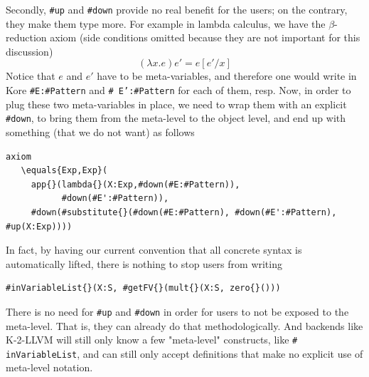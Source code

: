 \documentclass[UTF8,11pt]{article}
\theoremstyle{plain}
\theoremstyle{definition}
\theoremstyle{remark}
\newcommand{\sharpsymbol}{\#}
\newcommand{\sharpup}{\texttt{\sharpsymbol up}}
\newcommand{\sharpdown}{\texttt{\sharpsymbol down}}
\newcommand{\KPattern}{\texttt{\sharpsymbol Pattern}}
\begin{document}
Secondly, {\sharpup} and {\sharpdown} provide no real benefit for the users; on
the contrary, they make them type more.
For example in lambda calculus, we have the $\beta$-reduction axiom (side
conditions omitted because they are not important for this discussion)
$$(\lambda x . e)e' = e[e'/x]$$
Notice that $e$ and $e'$ have to be meta-variables, and therefore one would
write in Kore {\texttt{\sharpsymbol E:\KPattern}} and {\texttt{\sharpsymbol
E':\KPattern}} for each of them, resp.
Now, in order to plug these two meta-variables in place, we need to wrap them
with an explicit {\sharpdown}, to bring them from the meta-level to the object
level, and end up with something (that we do not want) as follows
\begin{lstlisting}[language=kore]
axiom
   \equals{Exp,Exp}(
     app{}(lambda{}(X:Exp,#down(#E:#Pattern)),
           #down(#E':#Pattern)),
     #down(#substitute{}(#down(#E:#Pattern), #down(#E':#Pattern), #up(X:Exp))))
\end{lstlisting}
In fact, by having our current convention that all concrete syntax is
automatically lifted, there is nothing to stop users from writing
\begin{lstlisting}[language=kore]
    #inVariableList{}(X:S, #getFV{}(mult{}(X:S, zero{}()))
\end{lstlisting}
There is no need for
{\sharpup} and {\sharpdown} in order for users to not be exposed
to the meta-level.  That
is, they can already do that methodologically. And backends like K-2-LLVM will
still only know a few "meta-level" constructs, like \texttt{\sharpsymbol
inVariableList{}}, and can still only
accept definitions that make no explicit use of meta-level notation.
\end{document}
